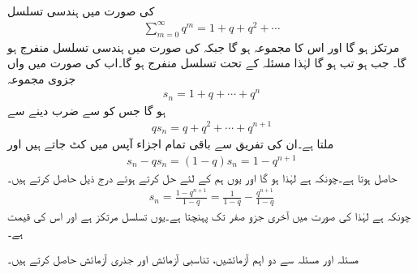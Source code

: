 \quad {}\\
 کی صورت میں ہندسی تسلسل
\begin{align*}
\sum_{m=0}^{\infty} q^m=1+q+q^2+\cdots
\end{align*}
مرتکز ہو گا اور اس کا مجموعہ  ہو گا جبکہ  کی صورت میں ہندسی تسلسل منفرج ہو گا۔ 
\quad
جب  ہو تب  ہو گا لہٰذا مسئلہ  کے تحت تسلسل منفرج ہو گا۔اب   کی صورت میں  واں جزوی مجموعہ
\begin{align*}
s_n=1+q+\cdots+q^n
\end{align*}
ہو گا جس کو  سے ضرب دینے سے
\begin{align*}
qs_n=q+q^2+\cdots+q^{n+1}
\end{align*}
ملتا ہے۔ان کی تفریق سے  باقی تمام اجزاء  آپس میں کٹ جاتے ہیں اور
\begin{align*}
s_n-qs_n=(1-q)s_n=1-q^{n+1}
\end{align*}
حاصل ہوتا ہے۔چونکہ  ہے لہٰذا  ہو گا اور یوں ہم  کے لئے حل کرتے ہوئے درج ذیل حاصل کرتے ہیں۔
\begin{align}
s_n=\frac{1-q^{n+1}}{1-q}=\frac{1}{1-q}-\frac{q^{n+1}}{1-q}
\end{align}
چونکہ  ہے لہٰذا  کی صورت میں  آخری جزو صفر تک پہنچتا ہے۔یوں تسلسل مرتکز ہے اور اس کی قیمت  ہے۔ 

مسئلہ  اور مسئلہ  سے دو اہم آزمائشیں، تناسبی آزمائش اور جذری آزمائش حاصل کرتے ہیں۔

